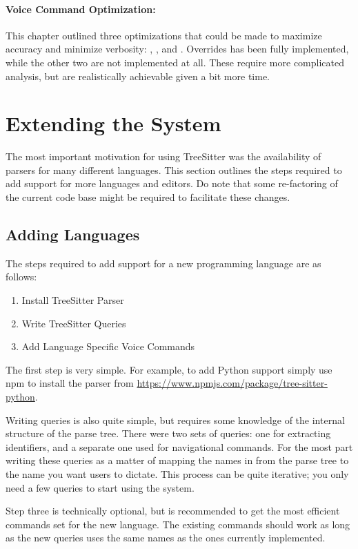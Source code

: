 \documentclass[../thesis.tex]{subfiles}
\begin{document}
\paragraph{Voice Command Optimization:}
This chapter outlined three optimizations that could be made to maximize accuracy
and minimize verbosity: , , and .
Overrides has been fully implemented, while the other two are not implemented at all.
These require more complicated analysis, but are realistically achievable given a bit more time.

\section{Extending the System}%
\label{sec:extending_the_system}
The most important motivation for using TreeSitter was the availability
of parsers for many different languages.
This section outlines the steps required to add support for more languages and editors.
Do note that some re-factoring of the current code base might be required
to facilitate these changes.

\subsection{Adding Languages}
The steps required to add support for a new programming language are as follows:
\begin{enumerate}
    \item Install TreeSitter Parser
    \item Write TreeSitter Queries
    \item Add Language Specific Voice Commands
\end{enumerate}
The first step is very simple.
For example, to add Python support simply use npm to install the parser from \url{https://www.npmjs.com/package/tree-sitter-python}.

Writing queries is also quite simple, but requires some knowledge of the internal structure
of the parse tree.
There were two sets of queries: one for extracting identifiers, and a separate one
used for navigational commands.
For the most part writing these queries as a matter of mapping the names
in from the parse tree to the name you want users to dictate.
This process can be quite iterative; you only need a few queries to start using the system.

Step three is technically optional, but is recommended to get the most efficient commands set for the new language.
The existing commands should work as long as the new queries uses the same names as the ones currently implemented.
\end{document}
